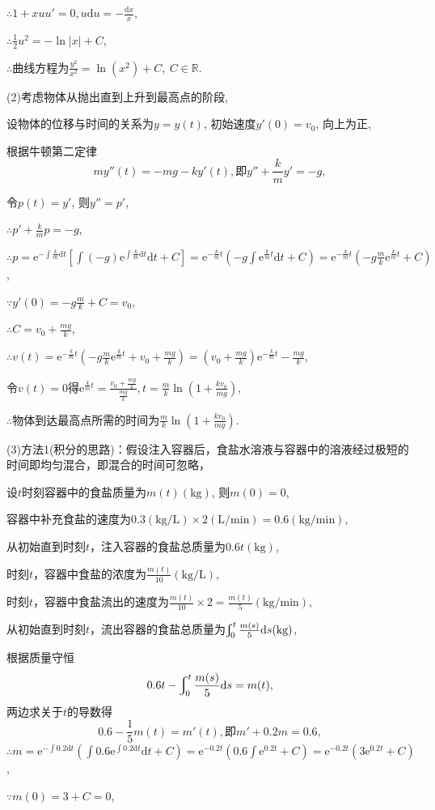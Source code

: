 \documentclass[12pt,UTF8]{ctexart}
\newcommand{\Int}[4]{\varint\nolimits_{#1}^{#2}#3\mathrm d#4}
\newcommand{\md}[1]{\mathrm d#1}
\newcommand{\me}[0]{\mathrm e}
\begin{document}
\begin{enumerate}
$\therefore 1+xuu'=0, u\md u=-\frac{\md x}x$, 

$\therefore\frac12u^2=-\ln|x|+C$,

$\therefore$曲线方程为$\frac{y^2}{x^2}=\ln(x^2)+C,\ C\in\mathbb R$.

(2)考虑物体从抛出直到上升到最高点的阶段,

设物体的位移与时间的关系为$y=y(t)$, 初始速度$y'(0)=v_0$, 向上为正,

根据牛顿第二定律
\[my''(t)=-mg-ky'(t),\text{即}y''+\frac kmy'=-g,\]

令$p(t)=y'$, 则$y''=p'$,

$\therefore p'+\frac kmp=-g$,

$\therefore p=\me^{-\int\frac km\md t}[\int(-g)\me^{\int\frac km\md t}\md t+C]=\me^{-\frac kmt}(-g\int\me^{\frac kmt}\md t+C)=\me^{-\frac kmt}(-g\frac mk\me^{\frac kmt}+C)$,

$\because y'(0)=-g\frac mk+C=v_0$,

$\therefore C=v_0+\frac{mg}k$,

$\therefore v(t)=\me^{-\frac kmt}(-g\frac mk\me^{\frac kmt}+v_0+\frac{mg}k)=(v_0+\frac{mg}k)\me^{-\frac kmt}-\frac{mg}k$,

令$v(t)=0$得$\me^{\frac kmt}=\frac{v_0+\frac{mg}k}{\frac{mg}k}, t=\frac mk\ln(1+\frac{kv_0}{mg})$,

$\therefore$物体到达最高点所需的时间为$\frac mk\ln(1+\frac{kv_0}{mg})$.

(3)方法1(积分的思路)：假设注入容器后，食盐水溶液与容器中的溶液经过极短的时间即均匀混合，即混合的时间可忽略，

设$t$时刻容器中的食盐质量为$m(t)(\text{kg})$, 则$m(0)=0$,

容器中补充食盐的速度为$0.3(\text{kg/L})\times2(\text{L/min})=0.6(\text{kg/min})$,

从初始直到时刻$t$，注入容器的食盐总质量为$0.6t(\text{kg})$,

时刻$t$，容器中食盐的浓度为$\frac{m(t)}{10}(\text{kg/L})$,

时刻$t$，容器中食盐流出的速度为$\frac{m(t)}{10}\times2=\frac{m(t)}5(\text{kg/min})$,

从初始直到时刻$t$，流出容器的食盐总质量为$\Int0t{\frac{m(s)}5}s(\text{kg})$,

根据质量守恒
\[0.6t-\Int0t{\frac{m(s)}5}s=m(t),\]
两边求关于$t$的导数得
\[0.6-\frac15m(t)=m'(t),\text{即}m'+0.2m=0.6,\]
$\therefore m=\me^{-\int0.2\md t}(\int0.6\me^{\int0.2\md t}\md t+C)=\me^{-0.2t}(0.6\int\me^{0.2t}+C)=\me^{-0.2t}(3\me^{0.2t}+C)$,

$\because m(0)=3+C=0$,


\end{enumerate}
\end{document}
